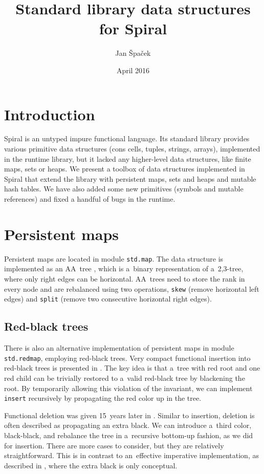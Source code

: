 \documentclass[a4paper,9pt,oneside,twocolumn,article]{memoir}
\begin{document}
\title{Standard library data structures for Spiral}
\date{April 2016}
\author{Jan Špaček}
\maketitle

\chapter{Introduction}

Spiral \cite{spiral} is an untyped impure functional language. Its standard
library provides various primitive data structures (cons cells, tuples, strings,
arrays), implemented in the runtime library, but it lacked any higher-level data
structures, like finite maps, sets or heaps. We present a toolbox of data
structures implemented in Spiral that extend the library with persistent maps,
sets and heaps and mutable hash tables. We have also added some new primitives
(symbols and mutable references) and fixed a handful of bugs in the runtime.

\chapter{Persistent maps}

Persistent maps are located in module \texttt{std.map}. The data structure is
implemented as an AA~tree \cite{andersson1993balanced}, which is a~binary
representation of a~2,3-tree, where only right edges can be horizontal. AA~trees
need to store the rank in every node and are rebalanced using two operations,
\texttt{skew} (remove horizontal left edges) and \texttt{split} (remove two
consecutive horizontal right edges).

\section{Red-black trees}

There is also an alternative implementation of persistent maps in module
\texttt{std.redmap}, employing red-black trees. Very compact functional
insertion into red-black trees is presented in  \cite{okasaki1999purely}. The key
idea is that a~tree with red root and one red child can be trivially restored to
a~valid red-black tree by blackening the root. By temporarily allowing this
violation of the invariant, we can implement \texttt{insert} recursively by
propagating the red color up in the tree.

Functional deletion was given 15~years later in \cite{germane2014deletion}.
Similar to insertion, deletion is often described as propagating an extra black.
We can introduce a~third color, black-black, and rebalance the tree in
a~recursive bottom-up fashion, as we did for insertion. There are more cases to
consider, but they are relatively straightforward. This is in contrast to
an~effective imperative implementation, as described in
\cite{thomas2001introduction}, where the extra black is only conceptual.
\end{document}
